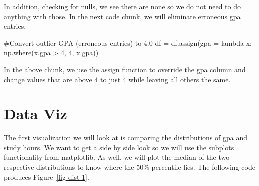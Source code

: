 \documentclass[
  letterpaper,
  DIV=11,
  numbers=noendperiod]{scrreprt}
\newenvironment{Shaded}{\begin{snugshade}}{\end{snugshade}}
\newcommand{\CommentTok}[1]{\textcolor[rgb]{0.37,0.37,0.37}{#1}}
\newcommand{\DecValTok}[1]{\textcolor[rgb]{0.68,0.00,0.00}{#1}}
\newcommand{\KeywordTok}[1]{\textcolor[rgb]{0.00,0.23,0.31}{#1}}
\newcommand{\NormalTok}[1]{\textcolor[rgb]{0.00,0.23,0.31}{#1}}
\newcommand{\OperatorTok}[1]{\textcolor[rgb]{0.37,0.37,0.37}{#1}}
\begin{document}
In addition, checking for nulls, we see there are none so we do not need
to do anything with those. In the next code chunk, we will eliminate
erroneous gpa entries.

\begin{Shaded}
\begin{Highlighting}[]
\CommentTok{\#Convert outlier GPA (erroneous entries) to 4.0}
\NormalTok{df }\OperatorTok{=}\NormalTok{ df.assign(gpa }\OperatorTok{=} \KeywordTok{lambda}\NormalTok{ x: np.where(x.gpa }\OperatorTok{\textgreater{}} \DecValTok{4}\NormalTok{, }\DecValTok{4}\NormalTok{, x.gpa))}
\end{Highlighting}
\end{Shaded}

In the above chunk, we use the assign function to override the gpa
column and change values that are above 4 to just 4 while leaving all
others the same.

\hypertarget{data-viz}{%
\section{Data Viz}\label{data-viz}}

The first visualization we will look at is comparing the distributions
of gpa and study hours. We want to get a side by side look so we will
use the subplots functionality from matplotlib. As well, we will plot
the median of the two respective distributions to know where the 50\%
percentile lies. The following code produces Figure~\ref{fig-dist-1}.
\end{document}
